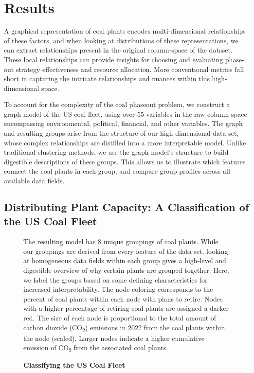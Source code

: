 \section{Results}

A graphical representation of coal plants encodes 
multi-dimensional relationships of these factors, and when looking at distributions of these representations, we can extract relationships present in the original 
column-space of the dataset. These local relationships can provide insights for choosing and evaluating phase-out strategy effectiveness and resource allocation. 
More conventional metrics fall short in capturing the intricate relationships and nuances within this high-dimensional space.

To account for the complexity of the coal phaseout problem, we construct a graph model of the US coal fleet, using over 55 variables in the raw column space 
encompassing environmental, political, financial, and other variables. The graph and resulting groups arise from the structure of our high dimensional data set, 
whose complex relationships are distilled into a more interpretable model. Unlike traditional clustering methods, we use the graph model’s structure to build 
digestible descriptions of these groups. This allows us to illustrate which features connect the coal plants in each group, and compare group profiles across all 
available data fields.

\subsection{Distributing Plant Capacity: A Classification of the US Coal Fleet}



\begin{figure}[H]
    
    \caption{\textbf{Classifying the US Coal Fleet}}
    \medskip
    \footnotesize
    The resulting model has 8 unique groupings of coal plants. While our groupings are derived from every feature of the data set, looking at homogeneous data fields within each group gives a high-level and digestible overview of why certain plants are grouped together. Here, we label the groups based on some defining characteristics for increased interpretability.
    The node coloring corresponds to the percent of coal plants within each node with plans to retire. Nodes with a higher percentage of retiring coal plants are assigned a darker red. The size of each node is proportional to the total amount of carbon dioxide (CO\textsubscript{2}) emissions in 2022 from the coal plants within the node (scaled). 
    Larger nodes indicate a higher cumulative emission of CO\textsubscript{2} from the associated coal plants.
    \label{fig:coal-fleet-partition}
\end{figure}




